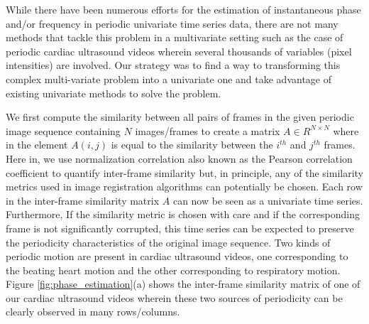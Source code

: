 \documentclass[runningheads,a4paper]{llncs}
\begin{document}
%
While there have been numerous efforts for the estimation of instantaneous phase and/or frequency in periodic univariate time series data\cite{Boashash1992,Lu2013,Luo2003}, there are not many methods that tackle this problem in a multivariate setting such as the case of periodic cardiac ultrasound videos wherein several thousands of variables (pixel intensities) are involved. Our strategy was to find a way to transforming this complex multi-variate problem into a univariate one and take advantage of existing univariate methods to solve the problem. 

	We first compute the similarity between all pairs of frames in the given periodic image sequence containing $N$ images/frames to create a matrix $A \in R^{N \times N}$ where in the element $A(i,j)$ is equal to the similarity between the $i^{th}$ and $j^{th}$ frames. Here in, we use normalization correlation also known as the Pearson correlation coefficient to quantify inter-frame similarity but, in principle, any of the similarity metrics used in image registration algorithms can potentially be chosen. Each row in the inter-frame similarity matrix $A$ can now be seen as a univariate time series. Furthermore, If the similarity metric is chosen with care and if the corresponding frame is not significantly corrupted, this time series can be expected to preserve the periodicity characteristics of the original image sequence. Two kinds of periodic motion are present in cardiac ultrasound videos, one corresponding to the beating heart motion and the other corresponding to respiratory motion. Figure \ref{fig:phase_estimation}(a) shows the inter-frame similarity matrix of one of our cardiac ultrasound videos wherein these two sources of periodicity can be clearly observed in many rows/columns. 
\end{document}
